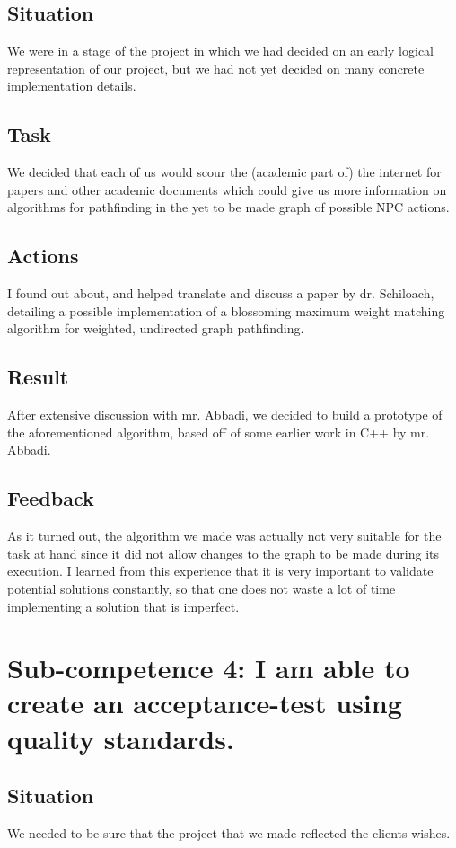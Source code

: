 \documentclass[11pt]{article}
\begin{document}
\subsection{Situation}
We were in a stage of the project in which we had decided on an early logical representation of our project, but we had not yet decided on many concrete implementation details.
\subsection{Task}
We decided that each of us would scour the (academic part of) the internet for papers and other academic documents which could give us more information on algorithms for pathfinding in the yet to be made graph of possible NPC actions.
\subsection{Actions}
I found out about, and helped translate and discuss a paper by dr. Schiloach, detailing a possible implementation of a blossoming maximum weight matching algorithm for weighted, undirected graph pathfinding.
\subsection{Result}
After extensive discussion with mr. Abbadi, we decided to build a prototype of the aforementioned algorithm, based off of some earlier work in C++ by mr. Abbadi. 
\subsection{Feedback}
As it turned out, the algorithm we made was actually not very suitable for the task at hand since it did not allow changes to the graph to be made during its execution. I learned from this experience that it is very important to validate potential solutions constantly, so that one does not waste a lot of time implementing a solution that is imperfect.


\newpage
\section{Sub-competence 4: I am able to create an
acceptance-test using quality
standards.  } 
\subsection{Situation}
We needed to be sure that the project that we made reflected the clients wishes.
\end{document}

